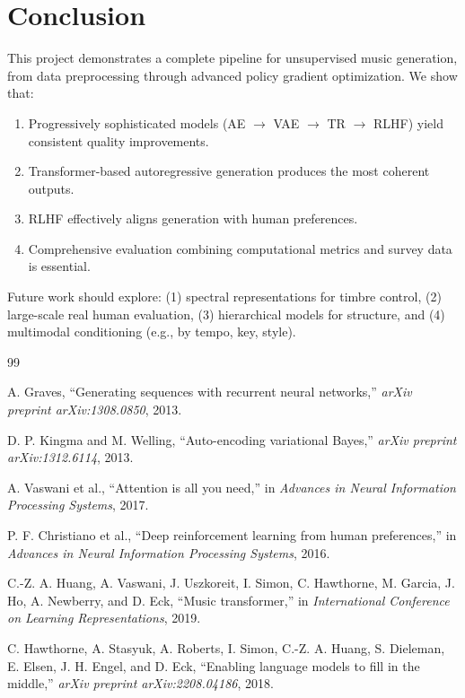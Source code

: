 \documentclass[conference]{IEEEtran}
\begin{document}
\section{Conclusion}

This project demonstrates a complete pipeline for unsupervised music generation, from data preprocessing through advanced policy gradient optimization. We show that:

\begin{enumerate}
\item Progressively sophisticated models (AE $\to$ VAE $\to$ TR $\to$ RLHF) yield consistent quality improvements.
\item Transformer-based autoregressive generation produces the most coherent outputs.
\item RLHF effectively aligns generation with human preferences.
\item Comprehensive evaluation combining computational metrics and survey data is essential.
\end{enumerate}

Future work should explore: (1) spectral representations for timbre control, (2) large-scale real human evaluation, (3) hierarchical models for structure, and (4) multimodal conditioning (e.g., by tempo, key, style).

\begin{thebibliography}{99}

A. Graves, ``Generating sequences with recurrent neural networks,'' \textit{arXiv preprint arXiv:1308.0850}, 2013.

D. P. Kingma and M. Welling, ``Auto-encoding variational Bayes,'' \textit{arXiv preprint arXiv:1312.6114}, 2013.

A. Vaswani et al., ``Attention is all you need,'' in \textit{Advances in Neural Information Processing Systems}, 2017.

P. F. Christiano et al., ``Deep reinforcement learning from human preferences,'' in \textit{Advances in Neural Information Processing Systems}, 2016.

C.-Z. A. Huang, A. Vaswani, J. Uszkoreit, I. Simon, C. Hawthorne, M. Garcia, J. Ho, A. Newberry, and D. Eck, ``Music transformer,'' in \textit{International Conference on Learning Representations}, 2019.

C. Hawthorne, A. Stasyuk, A. Roberts, I. Simon, C.-Z. A. Huang, S. Dieleman, E. Elsen, J. H. Engel, and D. Eck, ``Enabling language models to fill in the middle,'' \textit{arXiv preprint arXiv:2208.04186}, 2018.

\end{thebibliography}
\end{document}
